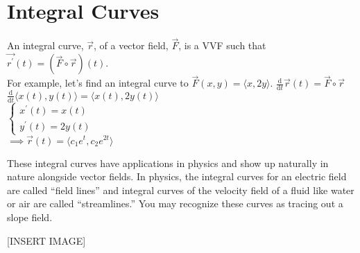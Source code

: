 \section{Integral Curves}
\noindent
An integral curve, $\vec{r}$, of a vector field, $\vec{F}$, is a VVF such that $\vec{r^\prime}(t)=\left(\vec{F}\circ\vec{r}\right)(t)$.\\

\noindent
For example, let's find an integral curve to $\vec{F}(x,y)=\langle x, 2y\rangle$.
\indent
$\frac{\mathrm{d}}{\mathrm{d}t}\vec{r}(t)=\vec{F}\circ\vec{r}$\\
\indent
$\frac{\mathrm{d}}{\mathrm{d}t}\langle x(t), y(t)\rangle=\langle x(t), 2 y(t)\rangle$\\
\indent
$\begin{cases}
	x^\prime(t)=x(t) \\
	y^\prime(t)=2 y(t)
\end{cases}$\\
\indent
$\implies \vec{r}(t)=\langle c_1 e^t, c_2 e^{2t}\rangle$

\noindent
These integral curves have applications in physics and show up naturally in nature alongside vector fields. In physics, the integral curves for an electric field are called “field lines” and integral curves of the velocity field of a fluid like water or air are called “streamlines.” You may recognize these curves as tracing out a slope field.

[INSERT IMAGE]